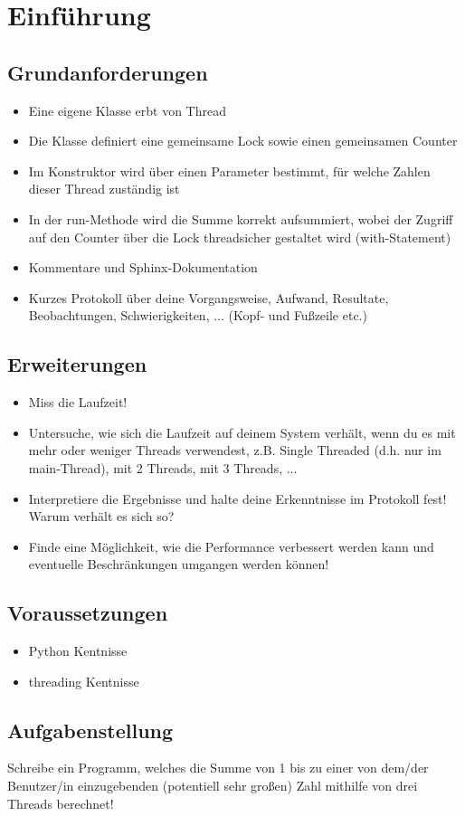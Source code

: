 
\section{Einführung}

\subsection{Grundanforderungen}

\begin{itemize}
	\item Eine eigene Klasse erbt von Thread
	\item Die Klasse definiert eine gemeinsame Lock sowie einen gemeinsamen Counter
	\item Im Konstruktor wird über einen Parameter bestimmt, für welche Zahlen dieser Thread zuständig ist
	\item In der run-Methode wird die Summe korrekt aufsummiert, wobei der Zugriff auf den Counter über die Lock threadsicher gestaltet wird (with-Statement)
	\item Kommentare und Sphinx-Dokumentation
	\item Kurzes Protokoll über deine Vorgangsweise, Aufwand, Resultate, Beobachtungen, Schwierigkeiten, ... (Kopf- und Fußzeile etc.)
\end{itemize}

\subsection{Erweiterungen}

\begin{itemize}
	\item Miss die Laufzeit!
	\item Untersuche, wie sich die Laufzeit auf deinem System verhält, wenn du es mit mehr oder weniger Threads verwendest, z.B. Single Threaded (d.h. nur im main-Thread), mit 2 Threads, mit 3 Threads, ...
	\item Interpretiere die Ergebnisse und halte deine Erkenntnisse im Protokoll fest! Warum verhält es sich so?
	\item Finde eine Möglichkeit, wie die Performance verbessert werden kann und eventuelle Beschränkungen umgangen werden können!
\end{itemize}

\subsection{Voraussetzungen}

\begin{itemize}
	\item Python Kentnisse
	\item threading Kentnisse
\end{itemize}


\subsection{Aufgabenstellung}

Schreibe ein Programm, welches die Summe von 1 bis zu einer von dem/der Benutzer/in einzugebenden (potentiell sehr großen) Zahl mithilfe von drei Threads berechnet!
\clearpage
